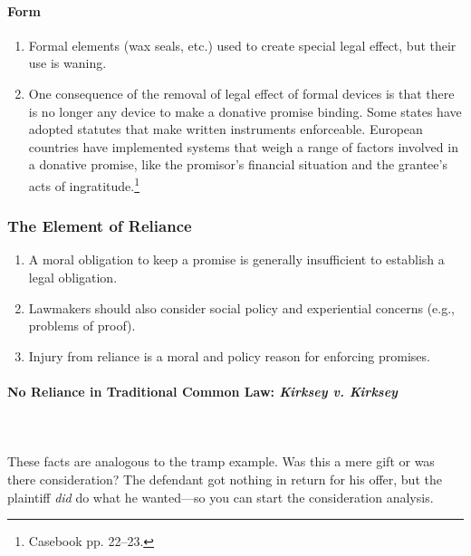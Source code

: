 \paragraph{Form}

\begin{enumerate}
    \item Formal elements (wax seals, etc.) used to create special legal 
    effect, but their use is waning.
    \item One consequence of the removal of legal effect of formal devices is 
    that there is no longer any device to make a donative promise binding. 
    Some states have adopted statutes that make written instruments 
    enforceable. European countries have implemented systems that weigh a 
    range of factors involved in a donative promise, like the promisor's 
    financial situation and the grantee's acts of 
    ingratitude.\footnote{Casebook pp. 22--23.}
\end{enumerate}

\subsubsection{The Element of Reliance}

\begin{enumerate}
    \item A moral obligation to keep a promise is generally insufficient to 
    establish a legal obligation.
    \item Lawmakers should also consider social policy and experiential 
    concerns (e.g., problems of proof).
    \item Injury from reliance is a moral and policy reason for enforcing 
    promises.
\end{enumerate}

\paragraph{No Reliance in Traditional Common Law: \emph{Kirksey v. Kirksey}}
~\\\\
These facts are analogous to the tramp example. Was this a mere gift or was 
there consideration? The defendant got nothing in return for his offer, but 
the plaintiff \emph{did} do what he wanted---so you can start the 
consideration analysis.

